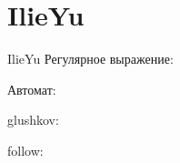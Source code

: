 \section{IlieYu}
\begin{frame}{IlieYu}
	Регулярное выражение:


	Автомат:


	glushkov:


	follow:


\end{frame}


